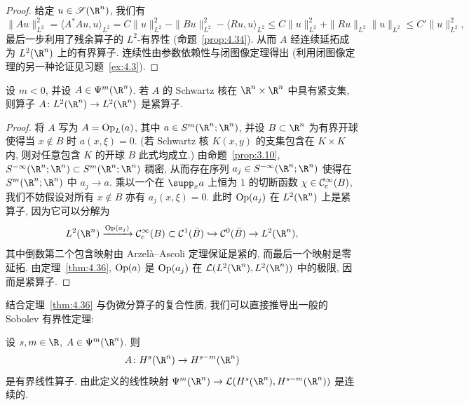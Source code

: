 \begin{proof}
给定 $u \in \Schwartz(\R^n)$, 我们有
\begin{equation}\label{eq:4.121}
    \|A u\|_{L^2}^2 = \langle A^* A u, u \rangle_{L^2} = C \|u\|_{L^2}^2 - \|B u\|_{L^2}^2 - \langle R u, u \rangle_{L^2} \le C \|u\|_{L^2}^2 + \|R u\|_{L^2} \|u\|_{L^2} \le C' \|u\|_{L^2}^2,
\end{equation}
最后一步利用了残余算子的 $L^2$-有界性 (命题~\ref{prop:4.34}). 从而 $A$ 经连续延拓成为 $L^2(\R^n)$ 上的有界算子. 连续性由参数依赖性与闭图像定理得出 (利用闭图像定理的另一种论证见习题~\ref{ex:4.3}).
\end{proof}

\begin{proposition}[负阶具紧支核算子的紧性]\label{prop:4.37}
设 $m < 0$, 并设 $A \in \Psi^m(\R^n)$. 若 $A$ 的 Schwartz 核在 $\R^n \times \R^n$ 中具有紧支集, 则算子 $A \colon L^2(\R^n) \to L^2(\R^n)$ 是紧算子.
\end{proposition}

\begin{proof}
将 $A$ 写为 $A = \operatorname{Op}_L(a)$, 其中 $a \in S^m(\R^n; \R^n)$, 并设 $B \subset \R^n$ 为有界开球使得当 $x \notin B$ 时 $a(x, \xi) = 0$. (若 Schwartz 核 $K(x, y)$ 的支集包含在 $K \times K$ 内, 则对任意包含 $K$ 的开球 $B$ 此式均成立.) 由命题~\ref{prop:3.10}, $S^{-\infty}(\R^n; \R^n) \subset S^m(\R^n; \R^n)$ 稠密, 从而存在序列 $a_j \in S^{-\infty}(\R^n; \R^n)$ 使得在 $S^m(\R^n; \R^n)$ 中 $a_j \to a$. 乘以一个在 $\supp_x a$ 上恒为 $1$ 的切断函数 $\chi \in \mathcal{C}_{\mathrm{c}}^\infty(B)$, 我们不妨假设对所有 $x \notin B$ 亦有 $a_j(x, \xi) = 0$. 此时 $\operatorname{Op}(a_j)$ 在 $L^2(\R^n)$ 上是紧算子, 因为它可以分解为
\begin{equation}\label{eq:4.122}
    L^2(\R^n) \xrightarrow{\Op(a_j)} \SmoothComp(B) \subset \mathcal{C}^1(\bar{B}) \hookrightarrow \mathcal{C}^0(\bar{B}) \to L^2(\R^n),
\end{equation}
其中倒数第二个包含映射由 Arzelà--Ascoli 定理保证是紧的, 而最后一个映射是零延拓. 由定理~\ref{thm:4.36}, $\operatorname{Op}(a)$ 是 $\operatorname{Op}(a_j)$ 在 $\mathcal{L}(L^2(\R^n), L^2(\R^n))$ 中的极限, 因而是紧算子.
\end{proof}

结合定理~\ref{thm:4.36} 与伪微分算子的复合性质, 我们可以直接推导出一般的 Sobolev 有界性定理:

\begin{corollary}\label{cor:4.38}
设 $s, m \in \R$, $A \in \Psi^m(\R^n)$. 则
\[
    A \colon H^s(\R^n) \to H^{s-m}(\R^n)
\]
是有界线性算子. 由此定义的线性映射 $\Psi^m(\R^n) \to \mathcal{L}(H^s(\R^n), H^{s-m}(\R^n))$ 是连续的.
\end{corollary}

